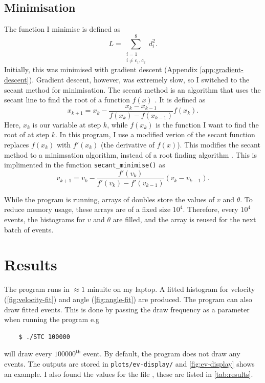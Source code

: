 \documentclass[11pt]{article}
\begin{document}
\subsection{Minimisation}
\label{sec:minimisation}
The function I minimise is defined as
\begin{equation}
    L = \sum\limits_{\substack{i=1 \\ i\neq c_1, c_2}}^{8} d_i^2.
    \label{eq:loss}
\end{equation}
Initially, this was minimised with gradient descent (Appendix \ref{app:gradient-descent}). Gradient descent, however, was extremely slow, so I switched to the secant method for minimisation. The secant method is an algorithm that uses the secant line to find the root of a function $f(x)$ \cite{secant-history}. It is defined as 
\begin{equation}
    x_{k+1} = x_k - \frac{x_k - x_{k-1}}{f(x_k)-f(x_{k-1})} f(x_k).
    \label{eq:secant}
\end{equation}
Here, $x_k$ is our variable at step $k$, while $f(x_k)$ is the function I want to find the root of at step $k$. In this program, I use a modified verion of the secant function replaces $f(x_k)$ with $f'(x_k)$ (the derivative of $f(x)$). This modifies the secant method to a minimsation algorithm, instead of a root finding algorithm \cite{secant-minimsation}. This is implimented in the function \texttt{secant\_minimise()} as
\begin{equation}
    v_{k+1} = v_k - \frac{f'(v_k)}{f'(v_k) - f'(v_{k-1})}(v_k - v_{k-1}).
\end{equation}

While the program is running, arrays of doubles store the values of $v$ and $\theta$. To reduce memory usage, these arrays are of a fixed size $10^4$. Therefore, every $10^4$ events, the histograms for $v$ and $\theta$ are filled, and the array is reused for the next batch of events.

\section{Results}
\label{sec:results}
The program runs in $\approx 1$ minuite on my laptop. A fitted histogram for velocity (\autoref{fig:velocity-fit}) and angle (\autoref{fig:angle-fit}) are produced. The program can also draw fitted events. This is done by passing the draw frequency as a parameter when running the program e.g
\begin{verbatim}
    $ ./STC 100000
\end{verbatim}
will draw every $100000^\text{th}$ event. By default, the program does not draw any events. The outputs are stored in \texttt{plots/ev-display/} and \autoref{fig:ev-display} shows an example. I also found the values for the file , these are listed in \autoref{tab:results}.
\end{document}
